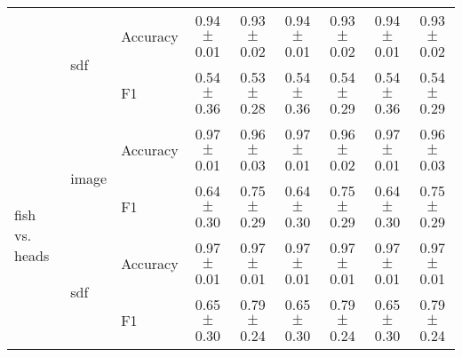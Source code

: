 \documentclass[anon,11pt]{9520} %
\begin{document}
\begin{table}
\begin{center}
\begin{tabular}{l|l|l|cc|cc|cc|}
& \multirow{2}{*}{sdf} & \multirow{1}{*}{Accuracy}& 0.94$\pm$0.01& 0.93$\pm$0.02& 0.94$\pm$0.01& 0.93$\pm$0.02& 0.94$\pm$0.01& 0.93$\pm$0.02\\ 
& & \multirow{1}{*}{F1}& 0.54$\pm$0.36& 0.53$\pm$0.28& 0.54$\pm$0.36& 0.54$\pm$0.29& 0.54$\pm$0.36& 0.54$\pm$0.29\\ \cline{2-9} 

\multirow{4}{*}{fish vs. heads}
& \multirow{2}{*}{image} & \multirow{1}{*}{Accuracy}& 0.97$\pm$0.01& 0.96$\pm$0.03& 0.97$\pm$0.01& 0.96$\pm$0.02& 0.97$\pm$0.01& 0.96$\pm$0.03\\ 
& & \multirow{1}{*}{F1}& 0.64$\pm$0.30& 0.75$\pm$0.29& 0.64$\pm$0.30& 0.75$\pm$0.29& 0.64$\pm$0.30& 0.75$\pm$0.29\\ \cline{2-9} 

& \multirow{2}{*}{sdf} & \multirow{1}{*}{Accuracy}& 0.97$\pm$0.01& 0.97$\pm$0.01& 0.97$\pm$0.01& 0.97$\pm$0.01& 0.97$\pm$0.01& 0.97$\pm$0.01\\ 
& & \multirow{1}{*}{F1}& 0.65$\pm$0.30& 0.79$\pm$0.24& 0.65$\pm$0.30& 0.79$\pm$0.24& 0.65$\pm$0.30& 0.79$\pm$0.24\\ \cline{2-9} 

\end{tabular}
\end{center}
\end{table}
\end{document}
